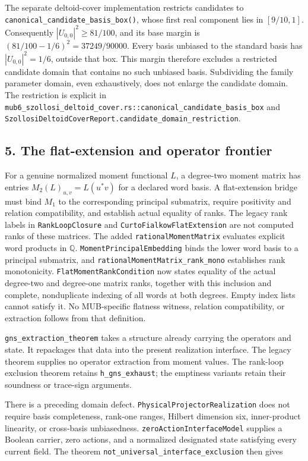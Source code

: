 \documentclass[
]{article}
\begin{document}
The separate deltoid-cover implementation restricts candidates to
\nolinkurl{canonical_candidate_basis_box()}, whose first real component
lies in \([9/10,1]\). Consequently \(|U_{0,0}|^2 \ge 81/100\), and its
base margin is \((81/100-1/6)^2=37249/90000\). Every basis unbiased to
the standard basis has \(|U_{0,0}|^2=1/6\), outside that box. This
margin therefore excludes a restricted candidate domain that contains no
such unbiased basis. Subdividing the family parameter domain, even
exhaustively, does not enlarge the candidate domain. The restriction is
explicit in
\nolinkurl{mub6_szollosi_deltoid_cover.rs::canonical_candidate_basis_box}
and \nolinkurl{SzollosiDeltoidCoverReport.candidate_domain_restriction}.

\subsection{5. The flat-extension and operator
frontier}\label{the-flat-extension-and-operator-frontier}

For a genuine normalized moment functional \(L\), a degree-two moment
matrix has entries \(M_2(L)_{u,v}=L(u^*v)\) for a declared word basis. A
flat-extension bridge must bind \(M_1\) to the corresponding principal
submatrix, require positivity and relation compatibility, and establish
actual equality of ranks. The legacy rank labels in
\nolinkurl{RankLoopClosure} and \nolinkurl{CurtoFialkowFlatExtension}
are not computed ranks of these matrices. The added
\nolinkurl{rationalMomentMatrix} evaluates explicit word products in
\(\mathbb Q\). \nolinkurl{MomentPrincipalEmbedding} binds the lower word
basis to a principal submatrix, and
\nolinkurl{rationalMomentMatrix_rank_mono} establishes rank
monotonicity. \nolinkurl{FlatMomentRankCondition} now states equality of
the actual degree-two and degree-one matrix ranks, together with this
inclusion and complete, nonduplicate indexing of all words at both
degrees. Empty index lists cannot satisfy it. No MUB-specific flatness
witness, relation compatibility, or extraction follows from that
definition.

\nolinkurl{gns_extraction_theorem} takes a structure already carrying
the operators and state. It repackages that data into the present
realization interface. The legacy theorem supplies no operator
extraction from moment values. The rank-loop exclusion theorem retains
\nolinkurl{h_gns_exhaust}; the emptiness variants retain their soundness
or trace-sign arguments.

There is a preceding domain defect.
\nolinkurl{PhysicalProjectorRealization} does not require basis
completeness, rank-one ranges, Hilbert dimension six, inner-product
linearity, or cross-basis unbiasedness.
\nolinkurl{zeroActionInterfaceModel} supplies a Boolean carrier, zero
actions, and a normalized designated state satisfying every current
field. The theorem \nolinkurl{not_universal_interface_exclusion} then
gives
\end{document}
